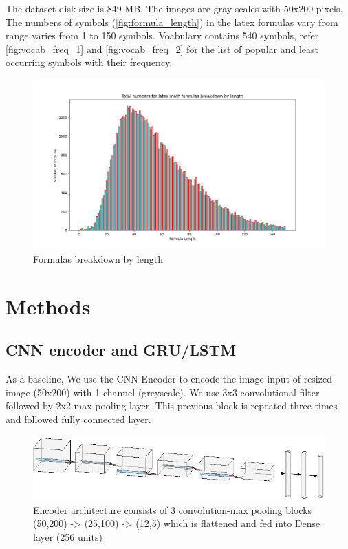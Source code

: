 \documentclass{article}
\begin{document}
 The dataset disk size is 849 MB. The images are gray scales with 50x200 pixels. The numbers of symbols (\autoref{fig:formula_length}) in the latex formulas vary from range varies from 1 to 150 symbols. Voabulary contains 540 symbols, refer \autoref{fig:vocab_freq_1} and \autoref{fig:vocab_freq_2} for the list of popular and least occurring symbols with their frequency.
 
\begin{figure}[H]
    \centering
    \includegraphics[scale=0.4]{fig_latex_formula_length.png}
    \caption{Formulas breakdown by length}
    \label{fig:formula_length}
\end{figure}

\section{Methods}

\subsection{CNN encoder and GRU/LSTM}
As a baseline, We use the CNN Encoder to encode the image input of resized image (50x200) with 1 channel (greyscale). We use 3x3 convolutional filter followed by 2x2 max pooling layer. This previous block is repeated three times and followed fully connected layer.

\begin{figure}[H]
    \centering
    \includegraphics[scale=0.4]{cnn_architecture.png}
    \caption{Encoder architecture consists of 3 convolution-max pooling blocks (50,200) -> (25,100) -> (12,5) which is flattened and fed into Dense layer (256 units)  }	
    \label{fig:cnn_lstm}
\end{figure}
\end{document}
